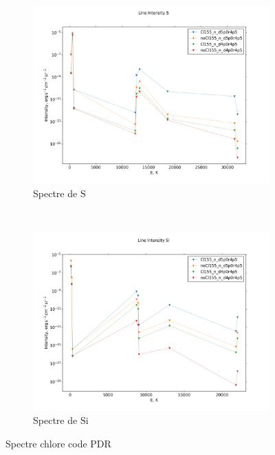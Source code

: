 \begin{figure}[!htbp]
    \begin{subfigure}[t]{0.45\textwidth} %
        \centering \includegraphics[trim = {0 0 0 1.5cm},clip,width=1\textwidth]{figure/Cl/gridModelEmiss/I_comp_S.png}
        \caption{Spectre de $\mathrm{S}$}
    \end{subfigure}
    ~
    \begin{subfigure}[t]{0.45\textwidth} %
        \centering \includegraphics[trim = {0 0 0 1.5cm},clip,width=1\textwidth]{figure/Cl/gridModelEmiss/I_comp_Si.png}
        \caption{Spectre de $\mathrm{Si}$}
    \end{subfigure}
    
    \caption{Spectre chlore code PDR \uncinq}
    \label{fig:Cl:gridModelEmiss:yes}
\end{figure}



